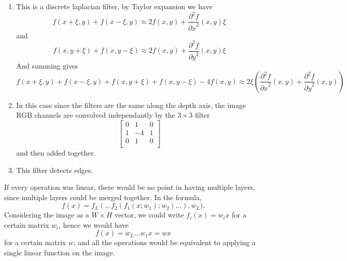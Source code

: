 \documentclass{article}
\newcommand{\pd}[2]{\frac{\partial #1}{\partial #2}}
\newcommand{\pdpow}[3]{\frac{\partial^{#3} #1}{{\partial #2}^{#3}}}
\begin{document}
\begin{enumerate}
\item This is a discrete laplacian filter, by Taylor expansion we have
  \begin{equation*}
    f(x +\xi, y) + f(x -\xi, y) \approx 2 f(x, y) + \pdpow{f}{x}{2}(x, y)\xi
  \end{equation*}
  and
  \begin{equation*}
    f(x, y +\xi) + f(x, y -\xi) \approx 2 f(x, y) + \pdpow{f}{y}{2}(x, y)\xi
  \end{equation*}
  And summing gives
  \begin{equation*}
    f(x +\xi, y) + f(x -\xi, y) + f(x, y +\xi) + f(x, y -\xi)  - 4 f(x, y) \approx 2 \xi \left( \pdpow{f}{x}{2}(x, y) + \pdpow{f}{y}{2}(x, y) \right)
  \end{equation*}

  \item In this case since the filters are the same along the depth axis, the
  image RGB channels are convolved independantly by the $3 \times 3$ filter
  \begin{equation*}
    \left[
      \begin{array}{ccc}
        0 & 1 & 0 \\
        1 & -4 & 1 \\
        0 & 1 & 0 \\
      \end{array}
    \right]
  \end{equation*}
  and then added together.

  \item This filter detects edges.
\end{enumerate}


If every operation was linear, there would be no point in having
multiple layers, since multiple layers could be merged together.
In the formula,
\begin{equation*}
  f(x) = f_L(\dots f_2(f_1(x;w_1);w_2)\dots),w_{L}).
\end{equation*}
Considering the image as a $W \times H$ vector, we could write
$f_i(x) = w_i x$ for a certain matrix $w_i$, hence we would have
\begin{equation*}
  f(x) = w_L\dots w_1 x = w x
\end{equation*}
for a certain matrix $w$, and all the operations would be equivalent
to applying a single linear function on the image.
\end{document}
